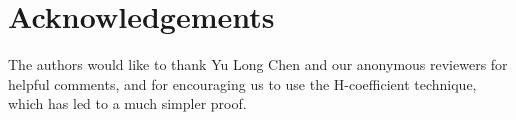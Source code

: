 \documentclass[eprint.tex]{subfiles}
\begin{document}
\section*{Acknowledgements}
The authors would like to thank Yu Long Chen and our anonymous reviewers for helpful comments,
and for encouraging us to use the H-coefficient technique,
which has led to a much simpler proof.
\subbib
\end{document}
